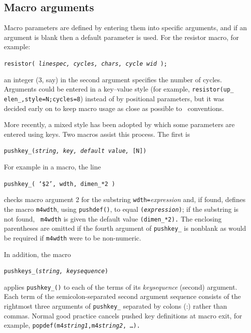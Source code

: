 \subsection{Macro arguments\label{Macroarguments:}}
Macro parameters are defined
by entering them into specific arguments, and if an argument is blank then
a default parameter is used.
For the resistor macro, for example:

{\tt resistor( {\sl linespec, cycles, chars, cycle wid} );}

\noindent
an integer (3, say) in the second argument specifies the number of cycles.
Arguments could be entered in a key--value style (for example,
{\tt resistor(up\_ elen\_,style=N;cycles=8}) instead of by positional
parameters, but it was decided early on
to keep macro usage as close as possible to \pic\ conventions.

More recently, a mixed style has been adopted by which some
parameters are entered using keys.  Two macros assist this process.
The first is

{\tt pushkey\_({\sl string, key, default value, }[N])}

For example in a macro, the line

{\tt pushkey\_( `\$2', wdth, dimen\_*2 )}

\noindent
checks macro argument 2 for the substring {\tt wdth=}{\sl expression}
and, if found, defines the macro {\tt m4wdth}, using {\tt pushdef()},
to equal {\tt ({\sl expression})}; if the substring is not found, {\tt
m4wdth} is given the default value {\tt (dimen\_*2).} The enclosing
parentheses are omitted if the fourth argument of {\tt pushkey\_} is
nonblank as would be required if {\tt m4wdth} were to be non-numeric.

In addition, the macro

{\tt pushkeys\_({\sl string, keysequence})}

\noindent
applies {\tt pushkey\_()} to each of the terms of its {\sl keysequence}
(second) argument.
Each term of the semicolon-separated second argument sequence
consists of the rightmost three
arguments of {\tt pushkey\_} separated by colons (:) rather than commas.
Normal good practice cancels pushed key definitions at macro exit,
for example,
{\tt popdef(\LQ{}m4{}{\sl string1}\RQ,\LQ{}m4{}{\sl string2}\RQ, \ldots ).}

